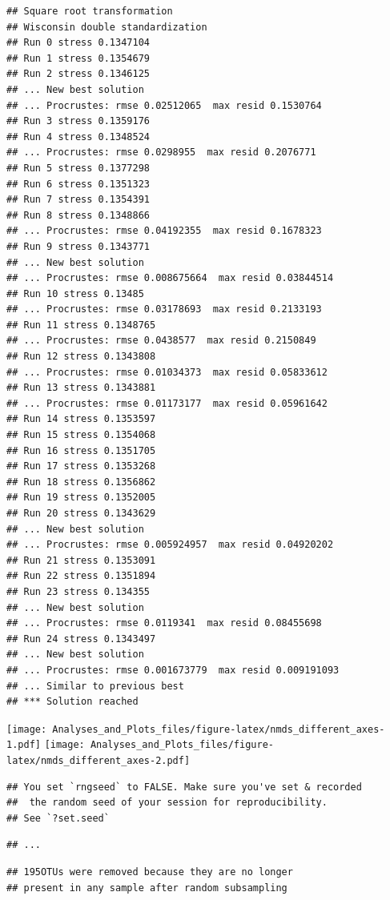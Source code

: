 \documentclass[]{article}
\begin{document}
\begin{verbatim}
## Square root transformation
## Wisconsin double standardization
## Run 0 stress 0.1347104 
## Run 1 stress 0.1354679 
## Run 2 stress 0.1346125 
## ... New best solution
## ... Procrustes: rmse 0.02512065  max resid 0.1530764 
## Run 3 stress 0.1359176 
## Run 4 stress 0.1348524 
## ... Procrustes: rmse 0.0298955  max resid 0.2076771 
## Run 5 stress 0.1377298 
## Run 6 stress 0.1351323 
## Run 7 stress 0.1354391 
## Run 8 stress 0.1348866 
## ... Procrustes: rmse 0.04192355  max resid 0.1678323 
## Run 9 stress 0.1343771 
## ... New best solution
## ... Procrustes: rmse 0.008675664  max resid 0.03844514 
## Run 10 stress 0.13485 
## ... Procrustes: rmse 0.03178693  max resid 0.2133193 
## Run 11 stress 0.1348765 
## ... Procrustes: rmse 0.0438577  max resid 0.2150849 
## Run 12 stress 0.1343808 
## ... Procrustes: rmse 0.01034373  max resid 0.05833612 
## Run 13 stress 0.1343881 
## ... Procrustes: rmse 0.01173177  max resid 0.05961642 
## Run 14 stress 0.1353597 
## Run 15 stress 0.1354068 
## Run 16 stress 0.1351705 
## Run 17 stress 0.1353268 
## Run 18 stress 0.1356862 
## Run 19 stress 0.1352005 
## Run 20 stress 0.1343629 
## ... New best solution
## ... Procrustes: rmse 0.005924957  max resid 0.04920202 
## Run 21 stress 0.1353091 
## Run 22 stress 0.1351894 
## Run 23 stress 0.134355 
## ... New best solution
## ... Procrustes: rmse 0.0119341  max resid 0.08455698 
## Run 24 stress 0.1343497 
## ... New best solution
## ... Procrustes: rmse 0.001673779  max resid 0.009191093 
## ... Similar to previous best
## *** Solution reached
\end{verbatim}

\texttt{[image: Analyses\_and\_Plots\_files/figure-latex/nmds\_different\_axes-1.pdf]}
\texttt{[image: Analyses\_and\_Plots\_files/figure-latex/nmds\_different\_axes-2.pdf]}

\begin{verbatim}
## You set `rngseed` to FALSE. Make sure you've set & recorded
##  the random seed of your session for reproducibility.
## See `?set.seed`
\end{verbatim}

\begin{verbatim}
## ...
\end{verbatim}

\begin{verbatim}
## 195OTUs were removed because they are no longer 
## present in any sample after random subsampling
\end{verbatim}
\end{document}
